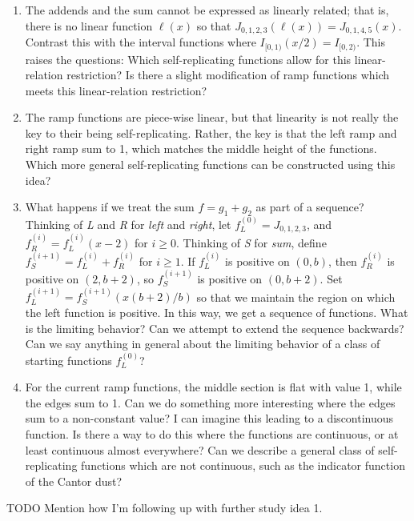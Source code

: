 \documentclass[]{article}
\providecommand{\tightlist}{%
  \setlength{\itemsep}{0pt}\setlength{\parskip}{0pt}}
\begin{document}
\begin{enumerate}
\def\labelenumi{\arabic{enumi}.}
\tightlist
\item
  The addends and the sum cannot be expressed as linearly related; that
  is, there is no linear function \(\ell(x)\) so that
  \(J_{0, 1, 2, 3}(\ell(x)) = J_{0, 1, 4, 5}(x)\). Contrast this with
  the interval functions where \(I_{[0, 1)}(x / 2) = I_{[0, 2)}\). This
  raises the questions: Which self-replicating functions allow for this
  linear-relation restriction? Is there a slight modification of ramp
  functions which meets this linear-relation restriction?
\item
  The ramp functions are piece-wise linear, but that linearity is not
  really the key to their being self-replicating. Rather, the key is
  that the left ramp and right ramp sum to 1, which matches the middle
  height of the functions. Which more general self-replicating functions
  can be constructed using this idea?
\item
  What happens if we treat the sum \(f = g_1 + g_2\) as part of a
  sequence? Thinking of \emph{L} and \emph{R} for \emph{left} and
  \emph{right}, let \(f^{(0)}_L = J_{0, 1, 2, 3}\), and
  \(f^{(i)}_R = f^{(i)}_L(x-2)\) for \(i \ge 0\). Thinking of \emph{S}
  for \emph{sum}, define \(f^{(i+1)}_S = f^{(i)}_L + f^{(i)}_R\) for
  \(i \ge 1\). If \(f^{(i)}_L\) is positive on \((0, b)\), then
  \(f^{(i)}_R\) is positive on \((2, b + 2)\), so \(f^{(i+1)}_S\) is
  positive on \((0, b + 2)\). Set
  \(f^{(i+1)}_L = f^{(i+1)}_S(x (b + 2) / b)\) so that we maintain the
  region on which the left function is positive. In this way, we get a
  sequence of functions. What is the limiting behavior? Can we attempt
  to extend the sequence backwards? Can we say anything in general about
  the limiting behavior of a class of starting functions \(f^{(0)}_L\)?
\item
  For the current ramp functions, the middle section is flat with value
  1, while the edges sum to 1. Can we do something more interesting
  where the edges sum to a non-constant value? I can imagine this
  leading to a discontinuous function. Is there a way to do this where
  the functions are continuous, or at least continuous almost
  everywhere? Can we describe a general class of self-replicating
  functions which are not continuous, such as the indicator function of
  the Cantor dust?
\end{enumerate}

TODO Mention how I'm following up with further study idea 1.
\end{document}
